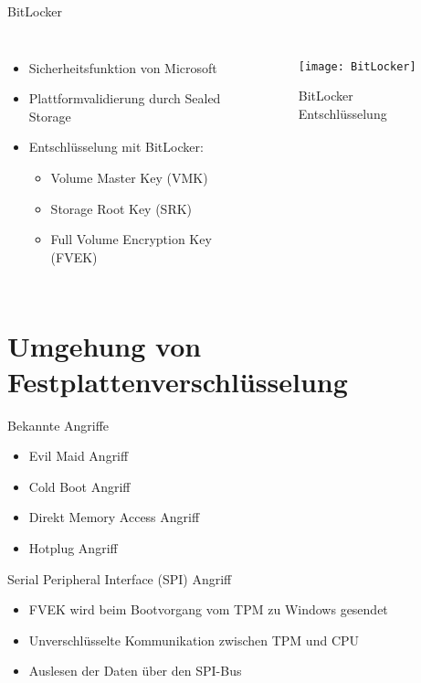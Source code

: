\documentclass[10pt]{beamer}
\begin{document}
	\begin{frame}[fragile]{BitLocker}
		
		\begin{columns}[T,onlytextwidth]
			\begin{itemize}[<+- | alert@+>]
				\item Sicherheitsfunktion von Microsoft 
				\item Plattformvalidierung durch Sealed Storage
				\item Entschlüsselung mit BitLocker:
				\begin{itemize}
					\item Volume Master Key (VMK)
					\item Storage Root Key (SRK)
					\item Full Volume Encryption Key (FVEK)
				\end{itemize}
			\end{itemize}
			
			\begin{figure}[h!]
				\centering
				\texttt{[image: BitLocker]}
				\caption{BitLocker Entschlüsselung}
			\end{figure}
		\end{columns}
	\cite{Dansimp.13122021}
	\end{frame}
	
	
	\section{Umgehung von Festplattenverschlüsselung}
	
	\begin{frame}{Bekannte Angriffe}
		\begin{itemize}[<+- | alert@+>]
			\item Evil Maid Angriff
			\item Cold Boot Angriff
			\item Direkt Memory Access Angriff
			\item Hotplug Angriff
		\end{itemize}
	\cite{GuruprasadBidare.2017}
	\end{frame}
	
	\begin{frame}{Serial Peripheral Interface (SPI) Angriff}
		
		\begin{itemize}[<+- | alert@+>]
			\item FVEK wird beim Bootvorgang vom TPM zu Windows gesendet
			\item Unverschlüsselte Kommunikation zwischen TPM und CPU
			\item Auslesen der Daten über den SPI-Bus
		\end{itemize}
	\end{frame}
	
\end{document}
